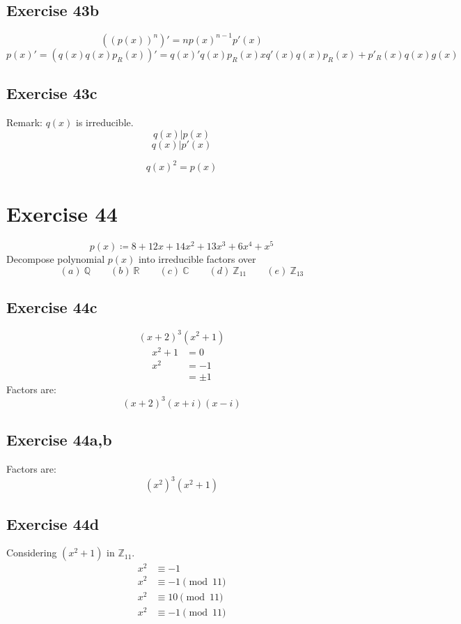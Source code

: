 \documentclass[a4paper]{article}
\theoremstyle{definition}
\begin{document}
\subsection{Exercise 43b}
\[ ((p(x))^n)' = n p(x)^{n-1} p'(x) \]
\[ p(x)' = (q(x) q(x) p_R(x))' = q(x)' q(x) p_R(x) x q'(x) q(x) p_R(x) + p'_R(x) q(x) g(x) \]

\subsection{Exercise 43c}
Remark: $q(x)$ is irreducible.
\[ q(x) | p(x) \]
\[ q(x) | p'(x) \]


\[ q(x)^2 = p(x) \]

\section*{Exercise 44}
\begin{ex}
  \[ p(x) \coloneqq 8 + 12x + 14x^2 + 13x^3 + 6x^4 + x^5 \]
  Decompose polynomial $p(x)$ into irreducible factors over
  \[
    (a) \: \mathbb Q \qquad
    (b) \: \mathbb R \qquad
    (c) \: \mathbb C \qquad
    (d) \: \mathbb Z_{11} \qquad
    (e) \: \mathbb Z_{13}
  \]
\end{ex}

\subsection{Exercise 44c}
\[ (x + 2)^3 (x^2+1) \]
\begin{align*}
  x^2 + 1 &= 0 \\
  x^2 &= -1 \\
    &= \pm 1
\end{align*}
Factors are:
\[ (x + 2)^3 (x + i) (x - i) \]

\subsection{Exercise 44a,b}
Factors are:
\[ (x^2)^3 (x^2 + 1) \]

\subsection{Exercise 44d}
Considering $(x^2+1)$ in $\mathbb Z_{11}$.
\begin{align*}
  x^2 &\equiv -1 \\
  x^2 &\equiv -1 \pmod{11} \\
  x^2 &\equiv 10 \pmod{11} \\
  x^2 &\equiv -1 \pmod{11} \\
\end{align*}
\end{document}
